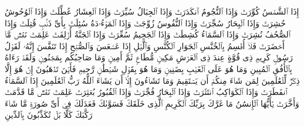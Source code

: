\startbuffer[\q:81:1]
إِذَا ٱلشَّمۡسُ كُوِّرَتۡ%
\stopbuffer%
\startbuffer[\q:81:2]
وَإِذَا ٱلنُّجُومُ ٱنكَدَرَتۡ%
\stopbuffer%
\startbuffer[\q:81:3]
وَإِذَا ٱلۡجِبَالُ سُیِّرَتۡ%
\stopbuffer%
\startbuffer[\q:81:4]
وَإِذَا ٱلۡعِشَارُ عُطِّلَتۡ%
\stopbuffer%
\startbuffer[\q:81:5]
وَإِذَا ٱلۡوُحُوشُ حُشِرَتۡ%
\stopbuffer%
\startbuffer[\q:81:6]
وَإِذَا ٱلۡبِحَارُ سُجِّرَتۡ%
\stopbuffer%
\startbuffer[\q:81:7]
وَإِذَا ٱلنُّفُوسُ زُوِّجَتۡ%
\stopbuffer%
\startbuffer[\q:81:8]
وَإِذَا ٱلۡمَوۡءُۥدَةُ سُئِلَتۡ%
\stopbuffer%
\startbuffer[\q:81:9]
بِأَیِّ ذَنۢبࣲ قُتِلَتۡ%
\stopbuffer%
\startbuffer[\q:81:10]
وَإِذَا ٱلصُّحُفُ نُشِرَتۡ%
\stopbuffer%
\startbuffer[\q:81:11]
وَإِذَا ٱلسَّمَاۤءُ كُشِطَتۡ%
\stopbuffer%
\startbuffer[\q:81:12]
وَإِذَا ٱلۡجَحِیمُ سُعِّرَتۡ%
\stopbuffer%
\startbuffer[\q:81:13]
وَإِذَا ٱلۡجَنَّةُ أُزۡلِفَتۡ%
\stopbuffer%
\startbuffer[\q:81:14]
عَلِمَتۡ نَفۡسࣱ مَّاۤ أَحۡضَرَتۡ%
\stopbuffer%
\startbuffer[\q:81:15]
فَلَاۤ أُقۡسِمُ بِٱلۡخُنَّسِ%
\stopbuffer%
\startbuffer[\q:81:16]
ٱلۡجَوَارِ ٱلۡكُنَّسِ%
\stopbuffer%
\startbuffer[\q:81:17]
وَٱلَّیۡلِ إِذَا عَسۡعَسَ%
\stopbuffer%
\startbuffer[\q:81:18]
وَٱلصُّبۡحِ إِذَا تَنَفَّسَ%
\stopbuffer%
\startbuffer[\q:81:19]
إِنَّهُۥ لَقَوۡلُ رَسُولࣲ كَرِیمࣲ%
\stopbuffer%
\startbuffer[\q:81:20]
ذِی قُوَّةٍ عِندَ ذِی ٱلۡعَرۡشِ مَكِینࣲ%
\stopbuffer%
\startbuffer[\q:81:21]
مُّطَاعࣲ ثَمَّ أَمِینࣲ%
\stopbuffer%
\startbuffer[\q:81:22]
وَمَا صَاحِبُكُم بِمَجۡنُونࣲ%
\stopbuffer%
\startbuffer[\q:81:23]
وَلَقَدۡ رَءَاهُ بِٱلۡأُفُقِ ٱلۡمُبِینِ%
\stopbuffer%
\startbuffer[\q:81:24]
وَمَا هُوَ عَلَى ٱلۡغَیۡبِ بِضَنِینࣲ%
\stopbuffer%
\startbuffer[\q:81:25]
وَمَا هُوَ بِقَوۡلِ شَیۡطَٰنࣲ رَّجِیمࣲ%
\stopbuffer%
\startbuffer[\q:81:26]
فَأَیۡنَ تَذۡهَبُونَ%
\stopbuffer%
\startbuffer[\q:81:27]
إِنۡ هُوَ إِلَّا ذِكۡرࣱ لِّلۡعَٰلَمِینَ%
\stopbuffer%
\startbuffer[\q:81:28]
لِمَن شَاۤءَ مِنكُمۡ أَن یَسۡتَقِیمَ%
\stopbuffer%
\startbuffer[\q:81:29]
وَمَا تَشَاۤءُونَ إِلَّاۤ أَن یَشَاۤءَ ٱللَّهُ رَبُّ ٱلۡعَٰلَمِینَ%
\stopbuffer%
\startbuffer[\q:82:1]
إِذَا ٱلسَّمَاۤءُ ٱنفَطَرَتۡ%
\stopbuffer%
\startbuffer[\q:82:2]
وَإِذَا ٱلۡكَوَاكِبُ ٱنتَثَرَتۡ%
\stopbuffer%
\startbuffer[\q:82:3]
وَإِذَا ٱلۡبِحَارُ فُجِّرَتۡ%
\stopbuffer%
\startbuffer[\q:82:4]
وَإِذَا ٱلۡقُبُورُ بُعۡثِرَتۡ%
\stopbuffer%
\startbuffer[\q:82:5]
عَلِمَتۡ نَفۡسࣱ مَّا قَدَّمَتۡ وَأَخَّرَتۡ%
\stopbuffer%
\startbuffer[\q:82:6]
یَٰۤأَیُّهَا ٱلۡإِنسَٰنُ مَا غَرَّكَ بِرَبِّكَ ٱلۡكَرِیمِ%
\stopbuffer%
\startbuffer[\q:82:7]
ٱلَّذِی خَلَقَكَ فَسَوَّىٰكَ فَعَدَلَكَ%
\stopbuffer%
\startbuffer[\q:82:8]
فِیۤ أَیِّ صُورَةࣲ مَّا شَاۤءَ رَكَّبَكَ%
\stopbuffer%
\startbuffer[\q:82:9]
كَلَّا بَلۡ تُكَذِّبُونَ بِٱلدِّینِ%
